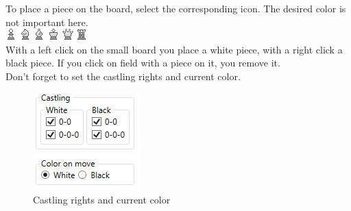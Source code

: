 \documentclass[11pt,a4paper]{article}
\begin{document}
To place a piece on the board, select the corresponding icon. The desired color is not important here.\\
\includegraphics[scale=1]{WhiteP.png} \includegraphics[scale=1]{WhiteN.png} 
\includegraphics[scale=1]{WhiteB.png} \includegraphics[scale=1]{WhiteK.png}
\includegraphics[scale=1]{WhiteQ.png} \includegraphics[scale=1]{WhiteR.png}\\

With a left click on the small board you place a white piece, with a right click a black piece.
If you click on field with a piece on it, you remove it.\\
Don't forget to set the castling rights and current color.

\begin{figure}[H]
	\centering
	\includegraphics[scale=1.0]{castling.png}
	\caption{Castling rights and current color}
	\label{fig:castling}
\end{figure}
\end{document}
